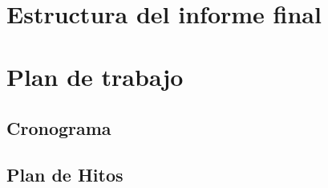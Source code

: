 \lipsum[20] \\
\lipsum[21] \\
\lipsum[22] \\
\lipsum[23] \\
\lipsum[24]

\clearpage

\section{Estructura del informe final}
\clearpage

\section{Plan de trabajo}
\subsection{Cronograma}

\subsection{Plan de Hitos}

\clearpage




